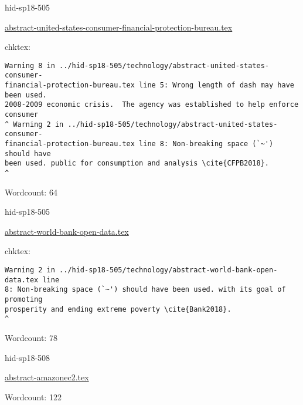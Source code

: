 \begin{IU}

hid-sp18-505

\href{https://github.com/cloudmesh-community/hid-sp18-505/blob/master//technology/abstract-united-states-consumer-financial-protection-bureau.tex}{abstract-united-states-consumer-financial-protection-bureau.tex}

 
chktex:
\begin{tiny}
\begin{verbatim}
Warning 8 in ../hid-sp18-505/technology/abstract-united-states-consumer-
financial-protection-bureau.tex line 5: Wrong length of dash may have been used.
2008-2009 economic crisis.  The agency was established to help enforce consumer
^ Warning 2 in ../hid-sp18-505/technology/abstract-united-states-consumer-
financial-protection-bureau.tex line 8: Non-breaking space (`~') should have
been used. public for consumption and analysis \cite{CFPB2018}.
^
\end{verbatim}
\end{tiny}

Wordcount: 64

\end{IU}



\begin{IU}

hid-sp18-505

\href{https://github.com/cloudmesh-community/hid-sp18-505/blob/master//technology/abstract-world-bank-open-data.tex}{abstract-world-bank-open-data.tex}

 
chktex:
\begin{tiny}
\begin{verbatim}
Warning 2 in ../hid-sp18-505/technology/abstract-world-bank-open-data.tex line
8: Non-breaking space (`~') should have been used. with its goal of promoting
prosperity and ending extreme poverty \cite{Bank2018}.
^
\end{verbatim}
\end{tiny}

Wordcount: 78

\end{IU}



\begin{IU}

hid-sp18-508

\href{https://github.com/cloudmesh-community/hid-sp18-508/blob/master//technology/abstract-amazonec2.tex}{abstract-amazonec2.tex}

 

Wordcount: 122

\end{IU}

